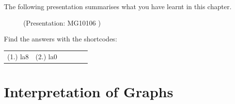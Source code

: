 \begin{enumerate}[noitemsep, label=\textbf{\arabic*}. ]
\begin{figure}[H]
\begin{center}
      \vspace{2pt}
    \vspace{.1in}
    
    \end{center}

 \end{figure}   

    \addtocounter{footnote}{-0}
            \end{enumerate}
        
          

        
      \label{m39414*eip-749}The following presentation summarises what you have learnt in this chapter.

    \setcounter{subfigure}{0}


	\begin{figure}[H] %
    
    \label{m39414*slidesharemedia}\label{m39414*slideshareflash} { (Presentation:  MG10106 )}
      
      \vspace{2pt}
    \vspace{.1in}
    
    

 \end{figure}   

    \addtocounter{footnote}{-0}
    \par 
    
    \label{m39414*eip-300}
\par {} Find the answers with the shortcodes:
 \par \begin{tabular}[h]{cccccc}
 (1.) la8  &  (2.) la0  & \end{tabular}


\section{Interpretation of Graphs}

